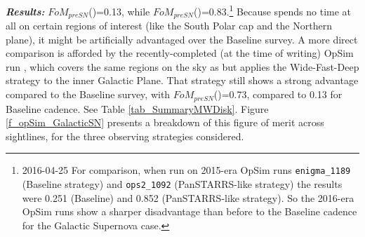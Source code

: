 {\it \bf Results:} $FoM_{preSN}$()=0.13,
while $FoM_{preSN}$()=0.83.\footnote{2016-04-25
For comparison, when run on 2015-era OpSim runs {\tt enigma\_1189}
(Baseline strategy) and {\tt ops2\_1092} (PanSTARRS-like strategy) the
results were 0.251 (Baseline) and 0.852 (PanSTARRS-like strategy). So
the 2016-era OpSim runs show a sharper disadvantage than before to the
Baseline cadence for the Galactic Supernova case.} Because  spends no time at all on certain regions of interest (like the South Polar cap and the Northern plane), it might be artificially advantaged over the Baseline survey. A more direct comparison is afforded by the recently-completed (at the time of writing) OpSim run , which covers the same regions on the sky as  but applies the Wide-Fast-Deep strategy to the inner Galactic Plane. That strategy still shows a strong advantage compared to the Baseline survey, with $FoM_{preSN}$()=0.73, compared to 0.13 for Baseline cadence. See Table \ref{tab_SummaryMWDisk}. Figure \ref{f_opSim_GalacticSN} presents a breakdown of this figure of merit across sightlines, for the three observing strategies considered.

